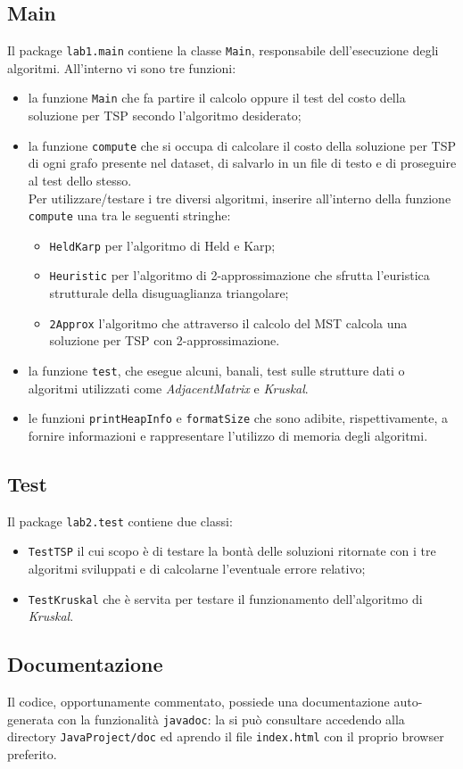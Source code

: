 \subsection{Main}
Il package \texttt{lab1.main} contiene la classe \texttt{Main}, responsabile dell'esecuzione degli algoritmi. All'interno vi sono tre funzioni:
\begin{itemize}
	\item la funzione \texttt{Main} che fa partire il calcolo oppure il test del costo della soluzione per TSP secondo l'algoritmo desiderato;
	\item la funzione \texttt{compute} che si occupa di calcolare il costo della soluzione per TSP di ogni grafo presente nel dataset, di salvarlo in un file di testo e di proseguire al test dello stesso.\\
	Per utilizzare/testare i tre diversi algoritmi, inserire all'interno della funzione \texttt{compute} una tra le seguenti stringhe:
	\begin{itemize}
		\item \texttt{HeldKarp} per l'algoritmo di Held e Karp;
		\item \texttt{Heuristic} per l'algoritmo di 2-approssimazione che sfrutta l'euristica strutturale della disuguaglianza triangolare;
		\item \texttt{2Approx} l'algoritmo che attraverso il calcolo del MST calcola una soluzione per TSP con 2-approssimazione.
	\end{itemize}
    \item la funzione \texttt{test}, che esegue alcuni, banali, test sulle strutture dati o algoritmi utilizzati come \textit{AdjacentMatrix} e \textit{Kruskal}.
    \item le funzioni \texttt{printHeapInfo} e \texttt{formatSize} che sono adibite, rispettivamente, a fornire informazioni e rappresentare l'utilizzo di memoria degli algoritmi.
\end{itemize}

\subsection{Test}
Il package \texttt{lab2.test} contiene due classi:
\begin{itemize}
	\item \texttt{TestTSP} il cui scopo è di testare la bontà delle soluzioni ritornate con i tre algoritmi sviluppati e di calcolarne l'eventuale errore relativo;
	\item \texttt{TestKruskal} che è servita per testare il funzionamento dell'algoritmo di \textit{Kruskal}.
\end{itemize}

\subsection{Documentazione}
Il codice, opportunamente commentato, possiede una documentazione auto-generata con la funzionalità \texttt{javadoc}: la si può consultare accedendo alla directory \texttt{JavaProject/doc} ed aprendo il file \texttt{index.html} con il proprio browser preferito. 
